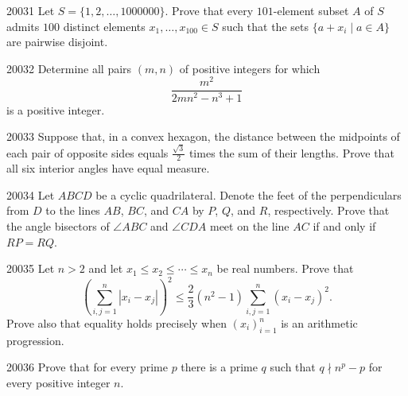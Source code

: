 
\begin{problem}{2003}{1}
Let $S=\{1, 2, \dots, 1000000\}$. Prove that every $101$-element subset $A$ of $S$ admits $100$ distinct elements $x_1, \dots, x_{100}\in S$ such that the sets $\{a+x_i\mid a\in A\}$ are pairwise disjoint.
\end{problem}

\begin{problem}{2003}{2}
Determine all pairs $(m, n)$ of positive integers for which
\[
    \frac{m^2}{2mn^2-n^3+1}
\]
is a positive integer.
\end{problem}

\begin{problem}{2003}{3}
Suppose that, in a convex hexagon, the distance between the midpoints of each pair of opposite sides equals $\frac{\sqrt3}{2}$ times the sum of their lengths. Prove that all six interior angles have equal measure.
\end{problem}

\begin{problem}{2003}{4}
Let $ABCD$ be a cyclic quadrilateral. Denote the feet of the perpendiculars from $D$ to the lines $AB$, $BC$, and $CA$ by $P$, $Q$, and $R$, respectively. Prove that the angle bisectors of $\angle ABC$ and $\angle CDA$ meet on the line $AC$ if and only if $RP=RQ$.
\end{problem}

\begin{problem}{2003}{5}
Let $n>2$ and let $x_1\leq x_2\leq\cdots\leq x_n$ be real numbers. Prove that
\[
    \left(\sum_{i,j=1}^n |x_i-x_j|\right)^2
    \leq\frac{2}{3}(n^2-1)\sum_{i,j=1}^n(x_i-x_j)^2.
\]
Prove also that equality holds precisely when $(x_i)_{i=1}^n$ is an arithmetic progression.
\end{problem}

\begin{problem}{2003}{6}
Prove that for every prime $p$ there is a prime $q$ such that $q\nmid n^p-p$ for every positive integer $n$.
\end{problem}
